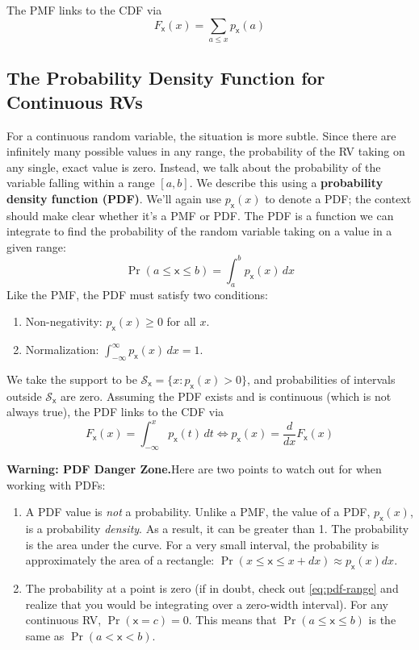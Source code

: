 The PMF links to the CDF via
\begin{equation}
    F_{\mathsf{x}}(x) = \sum_{a \le x} p_{\mathsf{x}}(a)
\end{equation}


\subsection{The Probability Density Function for Continuous RVs}
For a continuous random variable, the situation is more subtle. Since there are infinitely many possible values in any range, the probability of the RV taking on any single, exact value is zero.  Instead, we talk about the probability of the variable falling within a range $[a,b]$. We describe this using a \textbf{probability density function (PDF)}. We'll again use $p_{\mathsf{x}}(x)$ to denote a PDF; the context should make clear whether it's a PMF or PDF. The PDF is a function we can integrate to find the probability of the random variable taking on a value in a given range:
\begin{equation}
    \Pr(a \le \mathsf{x} \le b) = \int_{a}^{b} p_{\mathsf{x}}(x)\,dx
    \label{eq:pdf-range}
\end{equation}
Like the PMF, the PDF must satisfy two conditions:
\begin{enumerate}
    \item Non-negativity: $p_{\mathsf{x}}(x) \ge 0$ for all $x$.
    \item Normalization: $\int_{-\infty}^{\infty} p_{\mathsf{x}}(x)\,dx = 1$.
\end{enumerate}
We take the support to be $\mathcal{S}_{\mathsf{x}}=\{x: p_{\mathsf{x}}(x)>0\}$, and probabilities of intervals outside $\mathcal{S}_{\mathsf{x}}$ are zero. Assuming the PDF exists and is continuous (which is not always true), the PDF links to the CDF via
\begin{equation}
    F_{\mathsf{x}}(x) = \int_{-\infty}^{x} p_{\mathsf{x}}(t)\,dt \iff p_{\mathsf{x}}(x) = \frac{d}{dx}F_{\mathsf{x}}(x)
\end{equation}

\begin{warningBox}
    \textbf{Warning: PDF Danger Zone.}\quad Here are two points to watch out for when working with PDFs:
    \begin{enumerate}
        \item A PDF value is \emph{not} a probability. Unlike a PMF, the value of a PDF, $p_{\mathsf{x}}(x)$, is a probability \emph{density}. As a result, it can be greater than 1. The probability is the area under the curve. For a very small interval, the probability is approximately the area of a rectangle: $\Pr(x \le \mathsf{x} \le x+dx) \approx p_{\mathsf{x}}(x)dx$.
        \item The probability at a point is zero (if in doubt, check out \autoref{eq:pdf-range} and realize that you would be integrating over a zero-width interval). For any continuous RV, $\Pr(\mathsf{x}=c)=0$. This means that $\Pr(a \le \mathsf{x} \le b)$ is the same as $\Pr(a < \mathsf{x} < b)$.
    \end{enumerate}
\end{warningBox}

